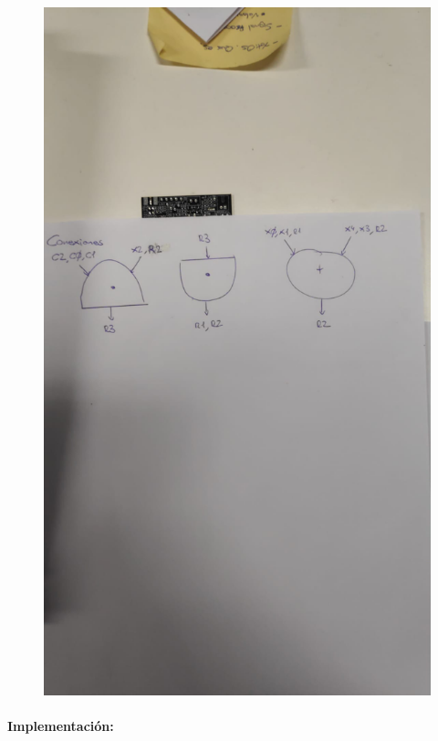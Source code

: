 \documentclass{article}
\begin{document}
\begin{figure}[H]
\centering
\includegraphics[width=1\linewidth]{images/2_2_3.png}
\end{figure}
\paragraph{Implementación:}
\end{document}
